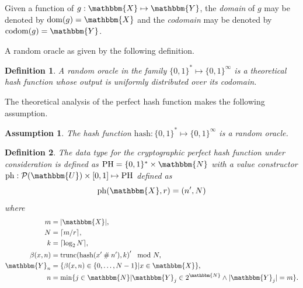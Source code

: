 \documentclass[hidelinks,11pt,final]{article}
\newcommand{\envnumstyle}{section}
\theoremstyle{plain}
\newtheorem{definition}{Definition}[\envnumstyle]
\newtheorem{assumption}{Assumption}
\newcommand{\cat}{\mathbin{\#}}
\newcommand{\PH}{\mathrm{PH}}
\newcommand{\ph}{\mathrm{ph}}
\newcommand{\PS}[1]{\mathcal{P}(#1)}
\begin{document}
Given a function of $g : \mathbbm{X} \mapsto \mathbbm{Y}$, the \emph{domain} of $g$ may be denoted by $\mathrm{dom}(g) = \mathbbm{X}$ and the \emph{codomain} may be denoted by $\mathrm{codom}(g) = \mathbbm{Y}$.

A random oracle as given by the following definition.
\begin{definition}
\label{def:randomoracle}
A random oracle in the family $\{0,1\}^{*} \mapsto \{0,1\}^{\infty}$ is a theoretical \emph{hash function} whose output is uniformly distributed over its codomain.
\end{definition}

The theoretical analysis of the perfect hash function makes the following assumption.
\begin{assumption}
\label{asm:ro_approx}
The hash function $\mathrm{hash} : \{0,1\}^{*} \mapsto \{0,1\}^{\infty}$ is a random oracle.
\end{assumption}



\begin{definition}
The \emph{data type} for the \emph{cryptographic} perfect hash function under consideration is defined as $\PH = \{0,1\}^* \times \mathbbm{N}$ with a value constructor $\ph : \PS{\mathbbm{U}} \times [0,1] \mapsto \PH$ defined as
\begin{equation}
	\mathrm{ph}(\mathbbm{X}, r) = (n',N)
\end{equation}
where
\begin{equation}
\begin{split}
m			&= |\mathbbm{X}|,\\
N 			&= \lceil m / r \rceil,\\
k			&= \lceil\log_2 N\rceil,\\
\beta(x,n) 	&= \mathrm{trunc}\!\left(\mathrm{hash}(x' \cat n'),k\right)' \mod N,\\
\mathbbm{Y}_n 	&= \{\beta(x,n) \in \{0,\ldots,N-1\}|x \in \mathbbm{X}\},\\
n 			& = \min\{ j \in \mathbbm{N} | \mathbbm{Y}_j \in 2^{\mathbbm{N}} \land |\mathbbm{Y}_j| = m\}.
\end{split}
\end{equation}
\end{definition}
\end{document}

